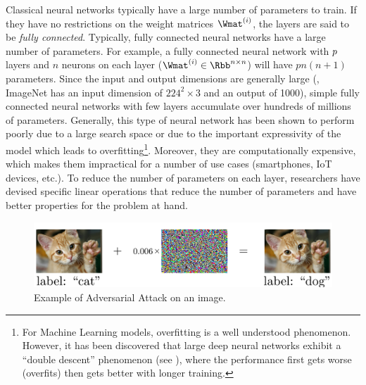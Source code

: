 Classical neural networks typically have a large number of parameters to train.
If they have no restrictions on the weight matrices $\Wmat^{(i)}$, the layers are said to be \emph{fully connected}.
Typically, fully connected neural networks have a large number of parameters.
For example, a fully connected neural network with $p$ layers and $n$ neurons on each layer ($\Wmat^{(i)} \in \Rbb^{n \times n}$) will have $pn (n + 1)$ parameters.
Since the input and output dimensions are generally large (\eg, ImageNet has an input dimension of $224^2 \times 3$ and an output of 1000), simple fully connected neural networks with few layers accumulate over hundreds of millions of parameters.
Generally, this type of neural network has been shown to perform poorly due to a large search space or due to the important expressivity of the model which leads to overfitting\footnote{For Machine Learning models, overfitting is a well understood phenomenon. However, it has been discovered that large deep neural networks exhibit a ``double descent'' phenomenon (see \cite{spigler2019jamming}), where the performance first gets worse (overfits) then gets  better with longer training.}.
Moreover, they are computationally expensive, which makes them impractical for a number of use cases (smartphones, IoT devices, etc.).
To reduce the number of parameters on each layer, researchers have devised specific linear operations that reduce the number of parameters and have better properties for the problem at hand.


\begin{figure}[t]
  \centering
  \includegraphics[width=\textwidth]{figures/main/ch1-introduction/ExampleAdversarialCatDog.pdf}
  \caption{Example of Adversarial Attack on an image.}
  \label{figure:ch1-adversarial_image_example}
\end{figure}

